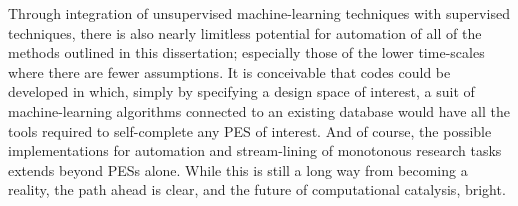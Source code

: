 \documentclass[12pt,oneside]{cmuthesis}
\begin{document}
Through integration of unsupervised machine-learning techniques with supervised techniques, there is also nearly limitless potential for automation of all of the methods outlined in this dissertation; especially those of the lower time-scales where there are fewer assumptions. It is conceivable that codes could be developed in which, simply by specifying a design space of interest, a suit of machine-learning algorithms connected to an existing database would have all the tools required to self-complete any PES of interest. And of course, the possible implementations for automation and stream-lining of monotonous research tasks extends beyond PESs alone. While this is still a long way from becoming a reality, the path ahead is clear, and the future of computational catalysis, bright.



\end{document}
